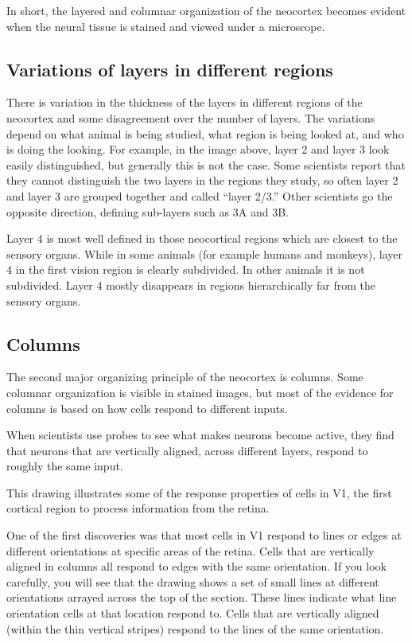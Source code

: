 \documentclass{report}
\begin{document}
In short, the layered and columnar organization of the neocortex
becomes evident when the neural tissue is stained and viewed under a
microscope.

\subsection*{Variations of layers in different regions}
There is variation in the thickness of the layers in different regions
of the neocortex and some disagreement over the number of layers. The
variations depend on what animal is being studied, what region is
being looked at, and who is doing the looking. For example, in the
image above, layer 2 and layer 3 look easily distinguished, but
generally this is not the case. Some scientists report that they
cannot distinguish the two layers in the regions they study, so often
layer 2 and layer 3 are grouped together and called ``layer 2/3.''
Other scientists go the opposite direction, defining sub-layers such
as 3A and 3B.


Layer 4 is most well defined in those neocortical regions which are
closest to the sensory organs. While in some animals (for example
humans and monkeys), layer 4 in the first vision region is clearly
subdivided. In other animals it is not subdivided. Layer 4 mostly
disappears in regions hierarchically far from the sensory organs.

\subsection*{Columns}
The second major organizing principle of the neocortex is
columns. Some columnar organization is visible in stained images, but
most of the evidence for columns is based on how cells respond to
different inputs.

When scientists use probes to see what makes neurons become active,
they find that neurons that are vertically aligned, across different
layers, respond to roughly the same input.


This drawing illustrates some of the response properties of cells in
V1, the first cortical region to process information from the retina.

One of the first discoveries was that most cells in V1 respond to
lines or edges at different orientations at specific areas of the
retina. Cells that are vertically aligned in columns all respond to
edges with the same orientation. If you look carefully, you will see
that the drawing shows a set of small lines at different orientations
arrayed across the top of the section. These lines indicate what line
orientation cells at that location respond to. Cells that are
vertically aligned (within the thin vertical stripes) respond to the
lines of the same orientation.
\end{document}
